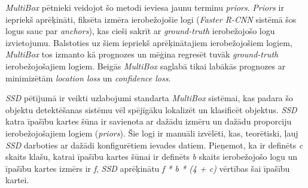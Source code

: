 \textit{MultiBox} pētnieki veidojot šo metodi ieviesa jaunu terminu \textit{priors}. \textit{Priors} ir iepriekš aprēķināti, fiksēta izmēra ierobežojošie logi (\textit{Faster R-CNN} sistēmā šos logus sauc par \textit{anchors}), kas cieši sakrīt ar \textit{ground-truth} ierobežojošo logu izvietojumu. Balstoties uz šiem iepriekš aprēķinātajiem ierobežojošiem logiem, \textit{MultiBox} tos izmanto kā prognozes un mēģina regresēt tuvāk \textit{ground-truth} ierobežojošajiem logiem. Beigās \textit{MultiBox} saglabā tikai labākās prognozes ar minimizētām \textit{location loss} un \textit{confidence loss}. 

\textit{SSD} pētījumā ir veikti uzlabojumi standarta \textit{MultiBox} sistēmai, kas padara šo objektu detektēšanas sistēmu vēl spējīgāku lokalizēt un klasificēt objektus. \textit{SSD} katra īpašību kartes šūna ir savienota ar dažādu izmēru un dažādu proporciju ierobežojošajiem logiem (\textit{priors}). Šie logi ir manuāli izvēlēti, kas, teorētiski, ļauj \textit{SSD} darboties ar dažādi konfigurētiem ievades datiem. Pieņemot, ka ir definēts \textit{c} skaits klašu, katrai īpašību kartes šūnai ir definēts \textit{b} skaits ierobežojošo logu un īpašību kartes izmērs ir \textit{f}, \textit{SSD} aprēķinātu \textit{f * b * (4 + c)}
vērtības šai īpašību kartei. 

